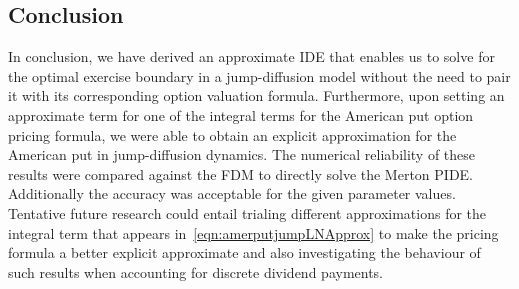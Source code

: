 \subsection{Conclusion}
In conclusion, we have derived an approximate IDE that enables us to solve for the optimal exercise boundary in a jump-diffusion model without the need to pair it with its corresponding option valuation formula. Furthermore, upon setting an approximate term for one of the integral terms for the American put option pricing formula, we were able to obtain an explicit approximation for the American put in jump-diffusion dynamics. The numerical reliability of these results were compared against the FDM to directly solve the Merton PIDE. Additionally the accuracy was acceptable for the given parameter values. Tentative future research could entail trialing different approximations for the integral term that appears in~\eqref{eqn:amerputjumpLNApprox} to make the pricing formula a better explicit approximate and also investigating the behaviour of such results when accounting for discrete dividend payments.